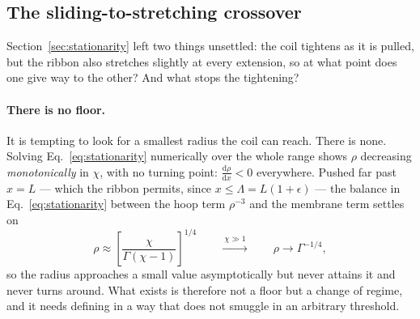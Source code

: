 \documentclass[11pt]{article}
\begin{document}
\subsection{The sliding-to-stretching crossover}
\label{sec:crossover}
Section~\ref{sec:stationarity} left two things unsettled: the coil tightens as it
is pulled, but the ribbon also stretches slightly at every extension, so at what
point does one give way to the other? And what stops the tightening?

\paragraph{There is no floor.} It is tempting to look for a smallest radius the
coil can reach. There is none. Solving Eq.~\eqref{eq:stationarity} numerically
over the whole range shows $\rho$ decreasing \emph{monotonically} in $\chi$, with
no turning point: $\frac{\mathrm d \rho}{\mathrm d x} < 0$ everywhere. Pushed far
past $x = L$ --- which the ribbon permits, since $x \le \Lambda = L(1+\epsilon)$
--- the balance in Eq.~\eqref{eq:stationarity} between the hoop term
$\rho^{-3}$ and the membrane term settles on
\begin{equation}\label{eq:rho_asymptote}
    \rho \approx \left[\frac{\chi}{\Gamma\left(\chi-1\right)}\right]^{1/4}
    \qquad\xrightarrow{\ \chi \gg 1\ }\qquad
    \rho \to \Gamma^{-1/4},
\end{equation}
so the radius approaches a small value asymptotically but never attains it and
never turns around. What exists is therefore not a floor but a change of regime,
and it needs defining in a way that does not smuggle in an arbitrary threshold.
\end{document}
